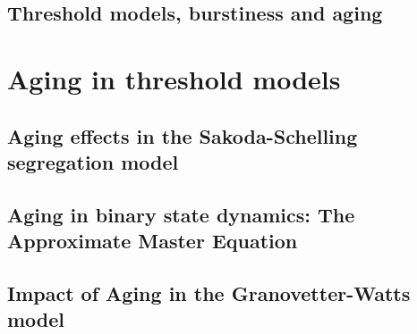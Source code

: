 \documentclass[
	11pt, %
	a4paper,
]{LegrandOrangeBook}
\begin{document}
\chapter{Threshold models, burstiness and aging}
%


\part{Aging in threshold models}

\chapterspaceabove{6.75cm}
\chapterspacebelow{7.25cm}

\chapter{\label{ch:Aging effects in the Sakoda-Schelling segregation model} Aging effects in the Sakoda-Schelling segregation model}
%

\chapterspaceabove{6.75cm}
\chapterspacebelow{7.25cm}

\chapter{\label{ch:Aging in binary state dynamics} Aging in binary state dynamics: The Approximate Master Equation}
%

\chapterspaceabove{6.75cm}
\chapterspacebelow{7.25cm}

\chapter{\label{ch:Aging in the Granovetter-Watts model} Impact of Aging in the Granovetter-Watts model}
%
\end{document}

